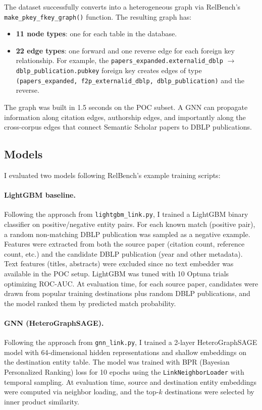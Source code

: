 \documentclass{article}
\begin{document}
The dataset successfully converts into a heterogeneous graph via RelBench's \texttt{make\_pkey\_fkey\_graph()} function.
The resulting graph has:

\begin{itemize}
    \item \textbf{11 node types}: one for each table in the database.
    \item \textbf{22 edge types}: one forward and one reverse edge for each foreign key relationship. For example, the \texttt{papers\_expanded.externalid\_dblp} $\to$ \texttt{dblp\_publication.pubkey} foreign key creates edges of type \texttt{(papers\_expanded, f2p\_externalid\_dblp, dblp\_publication)} and the reverse.
\end{itemize}

The graph was built in 1.5 seconds on the POC subset.
A GNN can propagate information along citation edges, authorship edges, and importantly along the cross-corpus edges that connect Semantic Scholar papers to DBLP publications.

\subsection{Models}

I evaluated two models following RelBench's example training scripts:

\paragraph{LightGBM baseline.}
Following the approach from \texttt{lightgbm\_link.py}, I trained a LightGBM binary classifier on positive/negative entity pairs.
For each known match (positive pair), a random non-matching DBLP publication was sampled as a negative example.
Features were extracted from both the source paper (citation count, reference count, etc.) and the candidate DBLP publication (year and other metadata).
Text features (titles, abstracts) were excluded since no text embedder was available in the POC setup.
LightGBM was tuned with 10 Optuna trials optimizing ROC-AUC.
At evaluation time, for each source paper, candidates were drawn from popular training destinations plus random DBLP publications, and the model ranked them by predicted match probability.

\paragraph{GNN (HeteroGraphSAGE).}
Following the approach from \texttt{gnn\_link.py}, I trained a 2-layer HeteroGraphSAGE model with 64-dimensional hidden representations and shallow embeddings on the destination entity table.
The model was trained with BPR (Bayesian Personalized Ranking) loss for 10 epochs using the \texttt{LinkNeighborLoader} with temporal sampling.
At evaluation time, source and destination entity embeddings were computed via neighbor loading, and the top-$k$ destinations were selected by inner product similarity.
\end{document}
